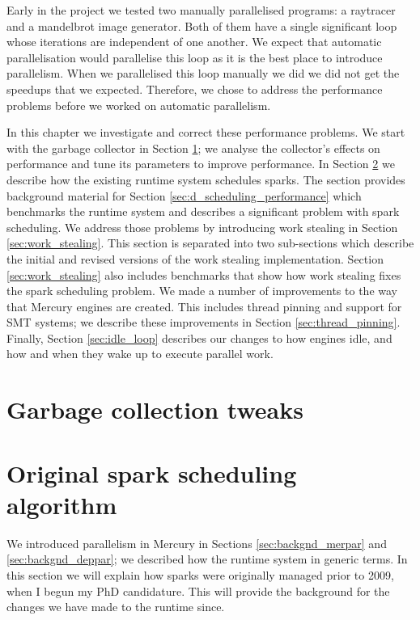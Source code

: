 

Early in the project
we tested two manually parallelised programs:
a raytracer and a mandelbrot image generator.
Both of them have a single significant loop
whose iterations are independent of one another.
We expect that automatic parallelisation would parallelise this loop
as it is the best place to introduce parallelism.
When we parallelised this loop manually we did
we did not get the speedups that we expected.
Therefore,
we chose to address the performance problems
before we worked on automatic parallelism.

In this chapter we investigate and correct these performance problems.
We start with the garbage collector in Section \ref{sec:gc};
we analyse the collector's effects on performance and tune its parameters
to improve performance.
In Section \ref{sec:original_scheduling} we describe how the existing runtime
system schedules sparks.
The section provides background material for Section
\ref{sec:d_scheduling_performance}
which benchmarks the runtime system and describes a significant problem with
spark scheduling.
We address those problems by introducing work stealing in Section
\ref{sec:work_stealing}.
This section is separated into two sub-sections
which describe the initial and revised versions of the work stealing
implementation.
Section \ref{sec:work_stealing} also includes benchmarks that show
how work stealing fixes the spark scheduling problem.
We made a number of improvements to the way that Mercury engines are created.
This includes thread pinning and support for SMT systems;
we describe these improvements in Section \ref{sec:thread_pinning}.
Finally, Section \ref{sec:idle_loop} describes our changes to how engines
idle,
and how and when they wake up to execute parallel work.

\section{Garbage collection tweaks}
\label{sec:gc}




\section{Original spark scheduling algorithm}
\label{sec:original_scheduling}


We introduced parallelism in Mercury in Sections \ref{sec:backgnd_merpar} and
\ref{sec:backgnd_deppar};
we described how the runtime system in generic terms.
In this section we will explain how sparks were originally managed
prior to 2009,
when I begun my PhD candidature.
This will provide the background for the changes we have made to the
runtime since.

